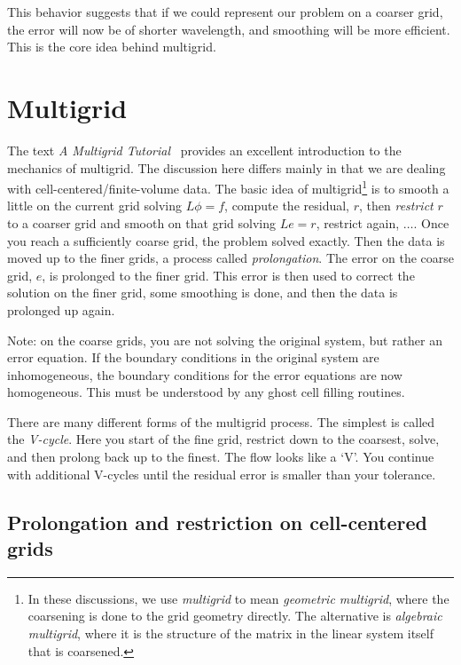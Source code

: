 This behavior suggests that if we could represent our
problem on a coarser grid, the error will now be of shorter
wavelength, and smoothing will be more efficient.  This is the core
idea behind multigrid.



\section{Multigrid}

The text {\em A Multigrid Tutorial}~\cite{multigridtutorial} provides
an excellent introduction to the mechanics of multigrid.  The
discussion here differs mainly in that we are dealing with
cell-centered/finite-volume data.  The basic idea of multigrid\footnote{
In these discussions, we use {\em multigrid} to mean {\em geometric multigrid},
where the coarsening is done to the grid geometry directly.  The alternative
is {\em algebraic multigrid}, where it is the structure of the matrix 
in the linear system itself that is coarsened.}   is to
smooth a little on the current grid solving $L\phi = f$, compute the
residual, $r$, then {\em restrict} $r$ to a coarser grid and smooth on
that grid solving $Le = r$, restrict again, $\ldots$.  Once you reach
a sufficiently coarse grid, the problem solved exactly.  Then the data
is moved up to the finer grids, a process called {\em prolongation}.
The error on the coarse grid, $e$, is prolonged to the finer grid.
This error is then used to correct the solution on the finer grid,
some smoothing is done, and then the data is prolonged up again.

Note: on the coarse grids, you are not solving the original system,
but rather an error equation.  If the boundary conditions in the
original system are inhomogeneous, the boundary conditions for the
error equations are now homogeneous.  This must be understood by
any ghost cell filling routines.

There are many different forms of the multigrid process.  The simplest 
is called the {\em V-cycle}.  Here you start of the fine grid, restrict
down to the coarsest, solve, and then prolong back up to the finest. 
The flow looks like a `V'.  You continue with additional V-cycles
until the residual error is smaller than your tolerance.

\subsection{Prolongation and restriction on cell-centered grids}

